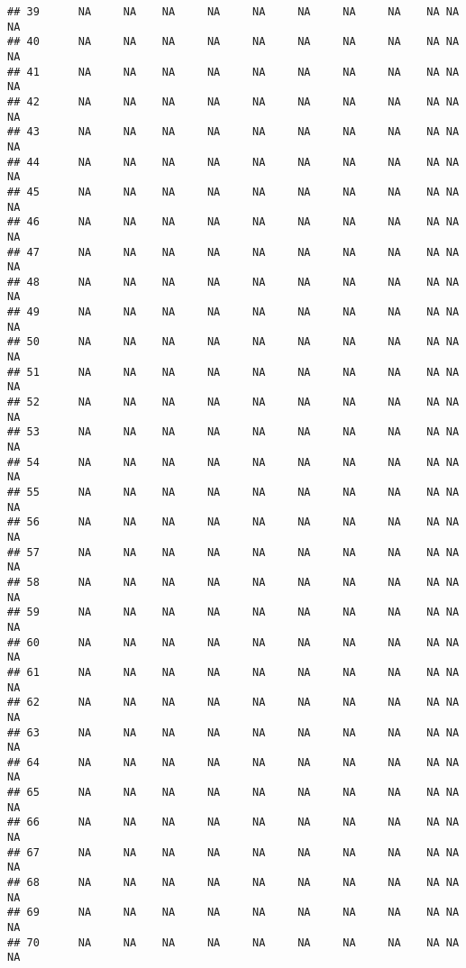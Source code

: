 \documentclass[]{article}
\begin{document}
\begin{verbatim}
## 39      NA     NA    NA     NA     NA     NA     NA     NA    NA NA          NA
## 40      NA     NA    NA     NA     NA     NA     NA     NA    NA NA          NA
## 41      NA     NA    NA     NA     NA     NA     NA     NA    NA NA          NA
## 42      NA     NA    NA     NA     NA     NA     NA     NA    NA NA          NA
## 43      NA     NA    NA     NA     NA     NA     NA     NA    NA NA          NA
## 44      NA     NA    NA     NA     NA     NA     NA     NA    NA NA          NA
## 45      NA     NA    NA     NA     NA     NA     NA     NA    NA NA          NA
## 46      NA     NA    NA     NA     NA     NA     NA     NA    NA NA          NA
## 47      NA     NA    NA     NA     NA     NA     NA     NA    NA NA          NA
## 48      NA     NA    NA     NA     NA     NA     NA     NA    NA NA          NA
## 49      NA     NA    NA     NA     NA     NA     NA     NA    NA NA          NA
## 50      NA     NA    NA     NA     NA     NA     NA     NA    NA NA          NA
## 51      NA     NA    NA     NA     NA     NA     NA     NA    NA NA          NA
## 52      NA     NA    NA     NA     NA     NA     NA     NA    NA NA          NA
## 53      NA     NA    NA     NA     NA     NA     NA     NA    NA NA          NA
## 54      NA     NA    NA     NA     NA     NA     NA     NA    NA NA          NA
## 55      NA     NA    NA     NA     NA     NA     NA     NA    NA NA          NA
## 56      NA     NA    NA     NA     NA     NA     NA     NA    NA NA          NA
## 57      NA     NA    NA     NA     NA     NA     NA     NA    NA NA          NA
## 58      NA     NA    NA     NA     NA     NA     NA     NA    NA NA          NA
## 59      NA     NA    NA     NA     NA     NA     NA     NA    NA NA          NA
## 60      NA     NA    NA     NA     NA     NA     NA     NA    NA NA          NA
## 61      NA     NA    NA     NA     NA     NA     NA     NA    NA NA          NA
## 62      NA     NA    NA     NA     NA     NA     NA     NA    NA NA          NA
## 63      NA     NA    NA     NA     NA     NA     NA     NA    NA NA          NA
## 64      NA     NA    NA     NA     NA     NA     NA     NA    NA NA          NA
## 65      NA     NA    NA     NA     NA     NA     NA     NA    NA NA          NA
## 66      NA     NA    NA     NA     NA     NA     NA     NA    NA NA          NA
## 67      NA     NA    NA     NA     NA     NA     NA     NA    NA NA          NA
## 68      NA     NA    NA     NA     NA     NA     NA     NA    NA NA          NA
## 69      NA     NA    NA     NA     NA     NA     NA     NA    NA NA          NA
## 70      NA     NA    NA     NA     NA     NA     NA     NA    NA NA          NA

\end{verbatim}
\end{document}
